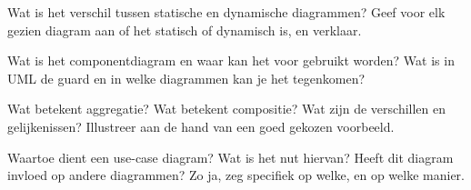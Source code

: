 \begin{solution}[print]

\end{solution}

\begin{question}
Wat is het verschil tussen statische en dynamische diagrammen? Geef voor elk gezien diagram aan of het statisch of dynamisch is, en verklaar.
\end{question}

\begin{solution}[print]

\end{solution}

\begin{question}
Wat is het componentdiagram en waar kan het voor gebruikt worden? Wat is in UML de guard en in welke diagrammen kan je het tegenkomen?
\end{question}

\begin{solution}[print]

\end{solution}

\begin{question}
Wat betekent aggregatie? Wat betekent compositie? Wat zijn de verschillen en gelijkenissen? Illustreer aan de hand van een goed gekozen voorbeeld.
\end{question}

\begin{solution}[print]

\end{solution}

\begin{question}
 Waartoe dient een use-case diagram? Wat is het nut hiervan? Heeft dit diagram invloed op andere diagrammen? Zo ja, zeg specifiek op welke, en op welke manier.
\end{question}

\begin{solution}[print]

\end{solution}

